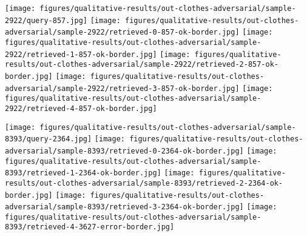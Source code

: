 \documentclass[10pt,journal,compsoc]{IEEEtran}
\begin{document}
\begin{figure*}[htbp]
\begin{center}
    \vspace{0.2cm}
    \texttt{[image: figures/qualitative-results/out-clothes-adversarial/sample-2922/query-857.jpg]}
    \texttt{[image: figures/qualitative-results/out-clothes-adversarial/sample-2922/retrieved-0-857-ok-border.jpg]}
    \texttt{[image: figures/qualitative-results/out-clothes-adversarial/sample-2922/retrieved-1-857-ok-border.jpg]}
    \texttt{[image: figures/qualitative-results/out-clothes-adversarial/sample-2922/retrieved-2-857-ok-border.jpg]}
    \texttt{[image: figures/qualitative-results/out-clothes-adversarial/sample-2922/retrieved-3-857-ok-border.jpg]}
    \texttt{[image: figures/qualitative-results/out-clothes-adversarial/sample-2922/retrieved-4-857-ok-border.jpg]}

    \vspace{0.2cm}
    \texttt{[image: figures/qualitative-results/out-clothes-adversarial/sample-8393/query-2364.jpg]}
    \texttt{[image: figures/qualitative-results/out-clothes-adversarial/sample-8393/retrieved-0-2364-ok-border.jpg]}
    \texttt{[image: figures/qualitative-results/out-clothes-adversarial/sample-8393/retrieved-1-2364-ok-border.jpg]}
    \texttt{[image: figures/qualitative-results/out-clothes-adversarial/sample-8393/retrieved-2-2364-ok-border.jpg]}
    \texttt{[image: figures/qualitative-results/out-clothes-adversarial/sample-8393/retrieved-3-2364-ok-border.jpg]}
    \texttt{[image: figures/qualitative-results/out-clothes-adversarial/sample-8393/retrieved-4-3627-error-border.jpg]}


\end{center}
\end{figure*}
\end{document}
